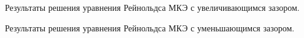 \documentclass[a4paper,14pt]{extarticle}
\begin{document}
Результаты решения уравнения Рейнольдса МКЭ с увеличивающимся зазором.
\begin{figure}[!htbp]
	\label{prilozh_pos}
\end{figure}

Результаты решения уравнения Рейнольдса МКЭ с уменьшающимся зазором.
\begin{figure}[!htbp]
	\label{prilozh_neg}
\end{figure}
\end{document}
